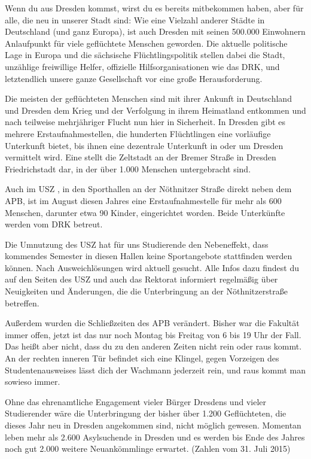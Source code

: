 
Wenn du aus Dresden kommst, wirst du es bereits mitbekommen haben, aber für alle, die neu in unserer Stadt sind: Wie eine Vielzahl anderer Städte in Deutschland (und ganz Europa), ist auch Dresden mit seinen 500.000 Einwohnern Anlaufpunkt für viele geflüchtete Menschen geworden. Die aktuelle politische Lage in Europa und die sächsische Flüchtlingspolitik stellen dabei die Stadt, unzählige freiwillige Helfer, offizielle Hilfsorganisationen wie das DRK, und letztendlich unsere ganze Gesellschaft vor eine große Herausforderung. 

Die meisten der geflüchteten Menschen sind mit ihrer Ankunft in Deutschland und Dresden dem Krieg und der Verfolgung in ihrem Heimatland entkommen und nach teilweise mehrjähriger Flucht nun hier in Sicherheit. In Dresden gibt es mehrere Erstaufnahmestellen, die hunderten Flüchtlingen eine vorläufige Unterkunft bietet, bis ihnen eine dezentrale Unterkunft in oder um Dresden vermittelt wird. Eine stellt die Zeltstadt an der Bremer Straße in Dresden Friedrichstadt dar, in der über 1.000 Menschen untergebracht sind.

Auch im USZ , in den Sporthallen an der Nöthnitzer Straße direkt neben dem APB, ist im August diesen Jahres eine Erstaufnahmestelle für mehr als 600 Menschen, darunter etwa 90 Kinder, eingerichtet worden.   Beide Unterkünfte werden vom DRK betreut.

Die Umnutzung des USZ hat für uns Studierende den Nebeneffekt, dass kommendes Semester in diesen Hallen keine Sportangebote stattfinden werden können. Nach Ausweichlösungen wird aktuell gesucht. Alle Infos dazu findest du auf den Seiten des USZ und auch das Rektorat informiert regelmäßig über Neuigkeiten und Änderungen, die die Unterbringung an der Nöthnitzerstraße betreffen. 

Außerdem wurden die Schließzeiten des APB verändert. Bisher war die Fakultät immer offen, jetzt ist das nur noch Montag bis Freitag von 6 bis 19 Uhr der Fall. Das heißt aber nicht, dass du zu den anderen Zeiten nicht rein oder raus kommt. An der rechten inneren Tür befindet sich eine Klingel, gegen Vorzeigen des Studentenausweises lässt dich der Wachmann jederzeit rein, und raus kommt man sowieso immer.

Ohne das ehrenamtliche Engagement vieler Bürger Dresdens und vieler Studierender wäre die Unterbringung der bisher über 1.200 Geflüchteten, die dieses Jahr neu in Dresden angekommen sind, nicht möglich gewesen. Momentan leben mehr als 2.600 Asylsuchende in Dresden und es werden bis Ende des Jahres noch gut 2.000 weitere Neuankömmlinge erwartet.  (Zahlen vom 31. Juli 2015) 

